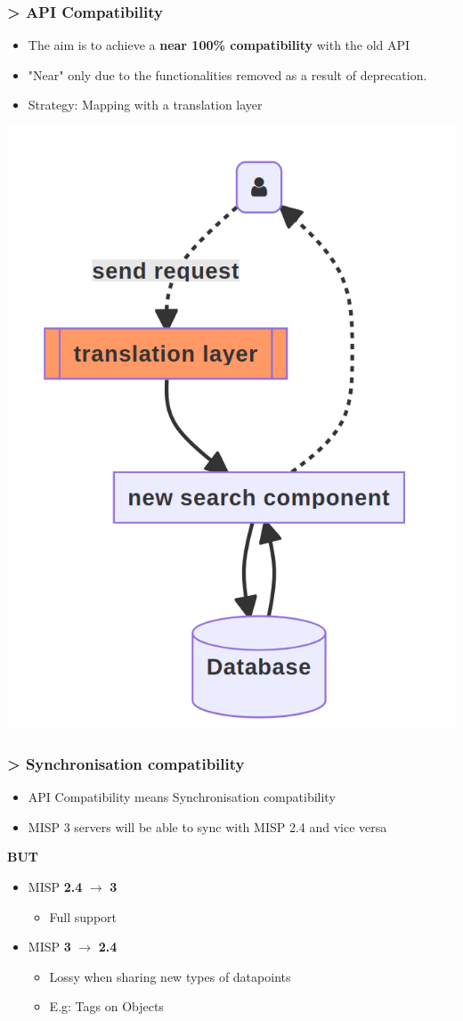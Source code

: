 \begin{frame}
    \frametitle{> API Compatibility}
    \begin{itemize}
        \item The aim is to achieve a \textbf{near 100\% compatibility} with the old API
        \item "Near" only due to the functionalities removed as a result of deprecation.
        \item Strategy: Mapping with a translation layer
    \end{itemize}
    \begin{center}
        \includegraphics[width=0.35\linewidth]{pictures/api-translation.png}
    \end{center}
\end{frame}

\begin{frame}
    \frametitle{> Synchronisation compatibility}
    \begin{itemize}
        \item API Compatibility means Synchronisation compatibility
        \item MISP 3 servers will be able to sync with MISP 2.4 and vice versa
    \end{itemize}
    \begin{center}
        \textbf{\large BUT}
    \end{center}
    \begin{itemize}
        \item MISP \textbf{2.4} $\rightarrow$ \textbf{3}
        \begin{itemize}
            \item Full support
        \end{itemize}
        \item MISP \textbf{3} $\rightarrow$ \textbf{2.4}
        \begin{itemize}
            \item Lossy when sharing new types of datapoints
            \item E.g: Tags on Objects
        \end{itemize}
    \end{itemize}
\end{frame}

